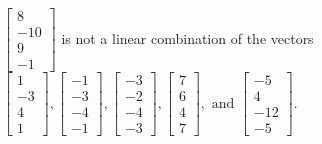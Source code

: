 \begin{exercise}
\begin{exerciseStatement}
  \end{exerciseStatement}
  \begin{exerciseAnswer}
   \(\left[\begin{array}{c}
8 \\
-10 \\
9 \\
-1
\end{array}\right]\) 
  	 is not  
	a linear combination of the vectors \(\left[\begin{array}{c}
1 \\
-3 \\
4 \\
1
\end{array}\right] , \left[\begin{array}{c}
-1 \\
-3 \\
-4 \\
-1
\end{array}\right] , \left[\begin{array}{c}
-3 \\
-2 \\
-4 \\
-3
\end{array}\right] , \left[\begin{array}{c}
7 \\
6 \\
4 \\
7
\end{array}\right] , \text{ and } \left[\begin{array}{c}
-5 \\
4 \\
-12 \\
-5
\end{array}\right]\).

	
  


  \end{exerciseAnswer}
\end{exercise}